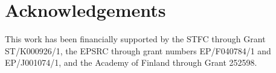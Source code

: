 \documentclass[journal, a4paper]{IEEEtran}
\begin{document}
\section*{Acknowledgements}
This work has been financially supported by the STFC through Grant ST/K000926/1, the EPSRC through grant numbers EP/F040784/1 and EP/J001074/1, and the Academy of Finland through Grant 252598. 
%


\end{document}
